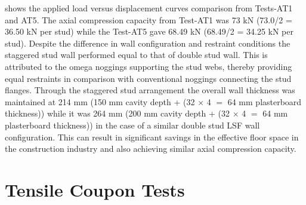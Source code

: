  shows the applied load versus displacement curves comparison from Tests-AT1 and AT5. The axial compression capacity from Test-AT1 was 73 kN (73.0/2 = 36.50 kN per stud) while the Test-AT5 gave 68.49 kN (68.49/2 = 34.25 kN per stud). Despite the difference in wall configuration and restraint conditions the staggered stud wall performed equal to that of double stud wall. This is attributed to the omega noggings supporting the stud webs, thereby providing equal restraints in comparison with conventional noggings connecting the stud flanges. Through the staggered stud arrangement the overall wall thickness was maintained at 214 mm (150 mm cavity depth + (32 $\times$ 4 $=$ 64 mm plasterboard thickness)) while it was 264 mm (200 mm cavity depth + (32 $\times$ 4 $=$ 64 mm plasterboard thickness)) in the case of a similar double stud LSF wall configuration. This can result in significant savings in the effective floor space in the construction industry and also achieving similar axial compression capacity. 

\section{Tensile Coupon Tests}\label{sec:tensile-coupon}


